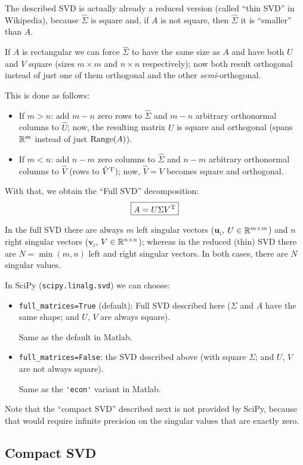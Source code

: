 \documentclass[
  12pt,
  paper=a4,
]{scrartcl} %
\begin{document}
The described SVD is actually already a reduced version (called ``thin SVD'' in Wikipedia), because $\hat\Sigma$ is square and, if $A$ is not square, then $\hat\Sigma$ it is ``smaller'' than $A$.

If $A$ is rectangular we can force $\hat\Sigma$ to have the same size as $A$ and have both $U$ and $V$ square (sizes $m\times m$ and $n\times n$ respectively); now both result orthogonal instead of just one of them orthogonal and the other \emph{semi}-orthogonal.

This is done as follows:
\begin{itemize}
    \item If $m>n$: add $m-n$ zero rows to $\hat\Sigma$ and $m-n$ arbitrary orthonormal columns to $\hat U$; now, the resulting matrix $U$ is square and orthogonal (spans $\mathbb R^m$ instead of just $\operatorname{Range}(A)$).
    \item If $m<n$: add $n-m$ zero columns to $\hat\Sigma$ and $n-m$ arbitrary orthonormal columns to $\hat V$ (rows to $\hat V^{\mathrm{T}}$); now, $\hat V=V$ becomes square and orthogonal.
\end{itemize}

With that, we obtain the ``Full SVD'' decomposition:
\[ \boxed{A = U \Sigma V^{\mathrm{T}}} \]

In the full SVD there are always $m$ left singular vectors ($\bm u_i$, $U\in\mathbb R^{m\times m}$) and $n$ right singular vectors ($\bm v_i$, $V\in\mathbb R^{n\times n}$); whereas in the reduced (thin) SVD there are $N=\min(m,n)$ left and right singular vectors. In both cases, there are $N$ singular values.

In SciPy (\verb|scipy.linalg.svd|) we can choose:
\begin{itemize}
    \item \verb|full_matrices=True| (default): Full SVD described here ($\Sigma$ and $A$ have the same shape; and $U$, $V$ are always square).
    
    Same as the default in Matlab.
    \item \verb|full_matrices=False|: the SVD described above (with square $\Sigma$; and $U$, $V$ are not always square).
    
    Same as the \verb|'econ'| variant in Matlab.
\end{itemize}
Note that the ``compact SVD'' described next is not provided by SciPy, because that would require infinite precision on the singular values that are exactly zero.

\subsection*{Compact SVD}
\end{document}
